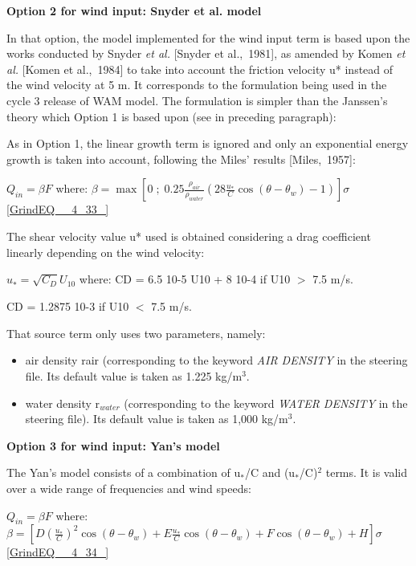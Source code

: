 {\bf  Option 2 for wind input: Snyder et al. model}

 In that option, the model implemented for the wind input term is based upon the works conducted by Snyder \textit{et al.} [Snyder et al.,~1981], as amended by Komen \textit{et al.} [Komen et al.,~1984] to take into account the friction velocity u* instead of the wind velocity at 5 m. It corresponds to the formulation being used in the cycle 3 release of WAM model. The formulation is simpler than the Janssen's theory which Option 1 is based upon (see in preceding paragraph):

 As in Option 1, the linear growth term is ignored and only an exponential energy growth is taken into account, following the Miles' results [Miles,~1957]:

$Q_{in} =\beta F$    where:  $\beta =\max \left[0\; ;\; 0.25\frac{\rho _{air} }{\rho _{water} } \left(28\frac{u_{*} }{C} \cos (\theta -\theta _{w} )-1\right)\right]\sigma $ \eqref{GrindEQ__4_33_}

 The shear velocity value u* used is obtained considering a drag coefficient linearly depending on the wind velocity:

$u_{*}^{} =\sqrt{C_{D} } U_{10} $ where:  CD = 6.5 10-5 U10 + 8 10-4 if U10 $>$ 7.5 m/s.

 CD = 1.2875 10-3 if U10 $<$ 7.5 m/s.

That source term only uses two parameters, namely:

\begin{itemize}
\item  air density rair (corresponding to the keyword \textit{AIR DENSITY} in the steering file. Its default value is taken as 1.225 kg/m${}^{3}$.

\item  water density r${}_{water}$ (corresponding to the keyword \textit{WATER DENSITY} in the steering file). Its default value is taken as 1,000 kg/m${}^{3}$.
\end{itemize}


{\bf  Option 3 for wind input: Yan's model}

 The Yan's model \cite{Yan1987} consists of a combination of u${}_{*}$/C and (u${}_{*}$/C)${}^{2}$ terms. It is valid over a wide range of frequencies and wind speeds:

$Q_{in} =\beta F$  where: $\beta =\left[D\left(\frac{u_{*} }{C} \right)^{2} \cos (\theta -\theta _{w} )+E\frac{u_{*} }{C} \cos (\theta -\theta _{w} )+F\cos (\theta -\theta _{w} )+H\right]\sigma $\textbf{ }\eqref{GrindEQ__4_34_}\textbf{}

